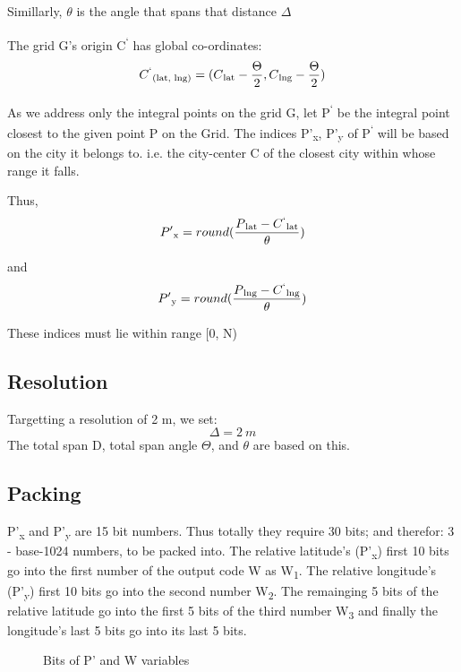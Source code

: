 \documentclass[conference]{IEEEtran}
\begin{document}
Simillarly, $\theta$ is the angle that spans that distance $\Delta$

The grid G's origin C\textsuperscript{`} has global co-ordinates:
\begin{equation}C\textsuperscript{`}\textsubscript{(lat, lng)} = ( C\textsubscript{lat} - \frac{\Theta}{2}, C\textsubscript{lng} - \frac{\Theta}{2})\end{equation}

As we address only the integral points on the grid G, let P\textsuperscript{`} be the integral point closest to the given point P on the Grid.
The indices P'\textsubscript{x}, P'\textsubscript{y} of P\textsuperscript{`} will be based on the city it belongs to.
i.e. the city-center C of the closest city within whose range it falls.


Thus, \begin{equation}P'\textsubscript{x} = round(\frac{P\textsubscript{lat} - C\textsuperscript{`}\textsubscript{lat}} {\theta})\end{equation}

and \begin{equation}P'\textsubscript{y}= round(\frac{P\textsubscript{lng} - C\textsuperscript{`}\textsubscript{lng}} {\theta})\end{equation}

These indices must lie within range [0, N)

\subsection{Resolution}
Targetting a resolution of 2 m, we set:
\begin{equation}\Delta = 2 \ m\end{equation}
The total span D, total span angle $\Theta$, and {$\theta$} are based on this.

\subsection{Packing}
P'\textsubscript{x} and P'\textsubscript{y} are 15 bit numbers.
Thus totally they require 30 bits; and therefor: 3 - base-1024 numbers, to be packed into.
The relative latitude's (P'\textsubscript{x}) first 10 bits go into the first number of the output code W as W\textsubscript{1}. The relative longitude's (P'\textsubscript{y}) first 10 bits go into the second number W\textsubscript{2}. The remainging 5 bits of the relative latitude go into the first 5 bits of the third number W\textsubscript{3} and finally the longitude's last 5 bits go into its last 5 bits.
\begin{figure}[htbp]
\centerline{}
\caption{Bits of P' and W variables}
\label{Packing}
\end{figure}
\end{document}
